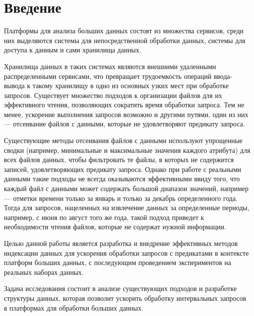\section*{Введение}

Платформы для анализа больших данных состоят из множества сервисов, среди них выделяются системы для непосредственной обработки данных, системы для доступа к данным и сами хранилища данных.

Хранилища данных в таких системах являются внешними удаленными распределенными сервисами, что превращает трудоемкость операций ввода-вывода к такому хранилищу в одно из основных узких мест при обработке запросов. Существует множество подходов к организации файлов для их эффективного чтения, позволяющих сократить время обработки запроса. Тем не менее, ускорение выполнения запросов возможно и другими путями, один из них --- отсеивание файлов с данными, которые не удовлетворяют предикату запроса.

Существующие методы отсеивания файлов с данными используют упрощенные сводки (например, минимальные и максимальные значения каждого атрибута) для всех файлов данных, чтобы фильтровать те файлы, в которых не содержится записей, удовлетворяющих предикату запроса. Однако при работе с реальными данными такие подходы не всегда оказываются эффективными ввиду того, что каждый файл с данными может содержать большой диапазон значений, например --- отметки времени только за январь и только за декабрь определенного года. Тогда для запросов, нацеленных на извлечение данных за определенные периоды, например, с июня по август того же года, такой подход приведет к необходимости чтения файлов, которые не содержат нужной информации.

Целью данной работы является разработка и внедрение эффективных методов индексации данных для ускорения обработки запросов с предикатами в контексте платформ больших данных, с последующим проведением экспериментов на реальных наборах данных.

Задача исследования состоит в анализе существующих подходов и разработке структуры данных, которая позволит ускорить обработку интервальных запросов в платформах для обработки больших данных.
